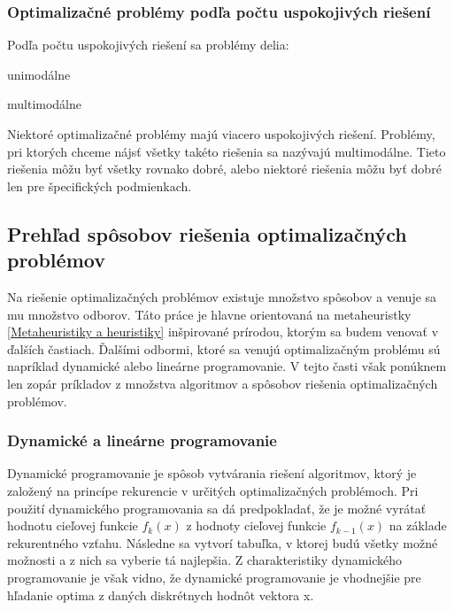 \subsubsection{Optimalizačné problémy podľa počtu uspokojivých riešení}

Podľa počtu uspokojivých riešení sa problémy delia:

\begin{my_itemize}
 \item unimodálne
 \item multimodálne
\end{my_itemize}

Niektoré optimalizačné problémy majú viacero uspokojivých riešení. Problémy, pri ktorých chceme nájsť všetky takéto riešenia sa nazývajú multimodálne. Tieto riešenia môžu byť všetky rovnako dobré, alebo niektoré riešenia môžu byť dobré len pre špecifických podmienkach.

\subsection{Prehľad spôsobov riešenia optimalizačných problémov}

Na riešenie optimalizačných problémov existuje množstvo spôsobov a venuje sa mu množstvo odborov. Táto práce je hlavne orientovaná na metaheuristky \ref{Metaheuristiky a heuristiky} inšpirované prírodou, ktorým sa budem venovať v ďalších častiach. Ďalšími odbormi, ktoré sa venujú optimalizačným problému sú napríklad dynamické alebo lineárne programovanie.\cite{MetahYang} V tejto časti však ponúknem len zopár príkladov z množstva algoritmov a spôsobov riešenia optimalizačných problémov.

\subsubsection{Dynamické a lineárne programovanie}

Dynamické programovanie je spôsob vytvárania riešení algoritmov, ktorý je založený na princípe rekurencie v určitých optimalizačných problémoch. Pri použití dynamického programovania sa dá predpokladať, že je možné vyrátať hodnotu cieľovej funkcie \(f_k(x)\) z hodnoty cieľovej funkcie \(f_{k-1}(x)\) na základe rekurentného vzťahu. Následne sa vytvorí tabuľka, v ktorej budú všetky možné možnosti a z nich sa vyberie tá najlepšia. Z charakteristiky dynamického programovanie je však vidno, že dynamické programovanie je vhodnejšie pre hľadanie optima z daných diskrétnych hodnôt vektora x.\cite{4}

